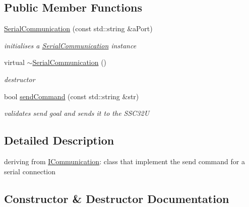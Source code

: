 \subsection*{Public Member Functions}
\begin{DoxyCompactItemize}
\item 
\hyperlink{classRobotInterface_1_1LowLevel_1_1SerialCommunication_aeb78f679f7b037ca0ecc099fe2cc6e73}{Serial\+Communication} (const std\+::string \&a\+Port)
\begin{DoxyCompactList}\small\item\em initialises a \hyperlink{classRobotInterface_1_1LowLevel_1_1SerialCommunication}{Serial\+Communication} instance \end{DoxyCompactList}\item 
virtual \hyperlink{classRobotInterface_1_1LowLevel_1_1SerialCommunication_a83db7cb65ef662a91f9e7451e85358cb}{$\sim$\+Serial\+Communication} ()\hypertarget{classRobotInterface_1_1LowLevel_1_1SerialCommunication_a83db7cb65ef662a91f9e7451e85358cb}{}\label{classRobotInterface_1_1LowLevel_1_1SerialCommunication_a83db7cb65ef662a91f9e7451e85358cb}

\begin{DoxyCompactList}\small\item\em destructor \end{DoxyCompactList}\item 
bool \hyperlink{classRobotInterface_1_1LowLevel_1_1SerialCommunication_a82fe3bcbc561e158ab7722f7182a97d7}{send\+Command} (const std\+::string \&str)
\begin{DoxyCompactList}\small\item\em validates send goal and sends it to the S\+S\+C32U \end{DoxyCompactList}\end{DoxyCompactItemize}


\subsection{Detailed Description}
deriving from \hyperlink{classRobotInterface_1_1LowLevel_1_1ICommunication}{I\+Communication}\+: class that implement the send command for a serial connection 

\subsection{Constructor \& Destructor Documentation}
